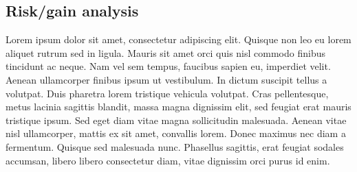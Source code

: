 \begin{rewrite}
%
%
\end{rewrite}



\subsection{Risk/gain analysis}


\begin{rewrite}
Lorem ipsum dolor sit amet, consectetur adipiscing elit. Quisque non leo eu
lorem aliquet rutrum sed in ligula. Mauris sit amet orci quis nisl commodo
finibus tincidunt ac neque. Nam vel sem tempus, faucibus sapien eu,
imperdiet velit. Aenean ullamcorper finibus ipsum ut vestibulum. In dictum
suscipit tellus a volutpat. Duis pharetra lorem tristique vehicula volutpat.
Cras pellentesque, metus lacinia sagittis blandit, massa magna dignissim
elit, sed feugiat erat mauris tristique ipsum. Sed eget diam vitae magna
sollicitudin malesuada. Aenean vitae nisl ullamcorper, mattis ex sit amet,
convallis lorem. Donec maximus nec diam a fermentum. Quisque sed malesuada
nunc. Phasellus sagittis, erat feugiat sodales accumsan, libero libero
consectetur diam, vitae dignissim orci purus id enim.

\end{rewrite}

